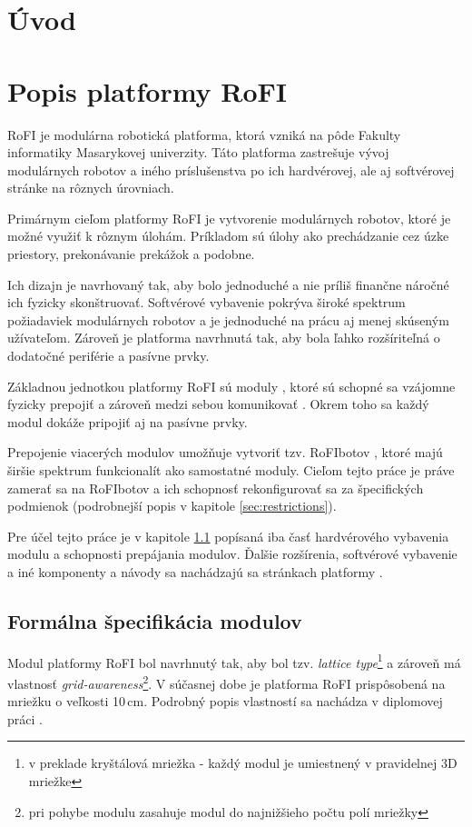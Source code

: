 \documentclass[
  digital, %
  twoside, %
  table,   %
  nolof,     %
  nolot,     %
]{fithesis3}
\begin{document}
\chapter*{Úvod}

\chapter{Popis platformy RoFI}
RoFI je modulárna robotická platforma, ktorá vzniká na pôde Fakulty informatiky Masarykovej univerzity. Táto platforma zastrešuje vývoj modulárnych robotov a iného príslušenstva po ich hardvérovej, ale aj softvérovej stránke na rôznych úrovniach. 

Primárnym cieľom platformy RoFI je vytvorenie modulárnych robotov, ktoré je možné využiť k rôznym úlohám. Príkladom sú úlohy ako prechádzanie cez úzke priestory, prekonávanie prekážok a podobne. 

Ich dizajn je navrhovaný tak, aby bolo jednoduché a nie príliš finančne náročné ich fyzicky skonštruovať. Softvérové vybavenie pokrýva široké spektrum požiadaviek modulárnych robotov a je jednoduché na prácu aj menej skúseným užívateľom. Zároveň je platforma navrhnutá tak, aby bola ľahko rozšíriteľná o dodatočné periférie a pasívne prvky. 

Základnou jednotkou platformy RoFI sú moduly \cite{mrazekMasterThesis}, ktoré sú schopné sa vzájomne fyzicky prepojiť a zároveň medzi sebou komunikovať \cite{rofiCom}. Okrem toho sa každý modul dokáže pripojiť aj na pasívne prvky. 

Prepojenie viacerých modulov umožňuje vytvoriť tzv. RoFIbotov \cite{rofiWeb}, ktoré majú širšie spektrum funkcionalít ako samostatné moduly. Cieľom tejto práce je práve zamerať sa na RoFIbotov a ich schopnosť rekonfigurovať sa za špecifických podmienok (podrobnejší popis v kapitole \ref{sec:restrictions}). 

Pre účel tejto práce je v kapitole \ref{sec:moduleSpec} popísaná iba časť hardvérového vybavenia modulu a schopnosti prepájania modulov. Ďalšie rozšírenia, softvérové vybavenie a iné komponenty a návody sa nachádzajú sa stránkach platformy \cite{rofiWeb}. 

\section{Formálna špecifikácia modulov}
\label{sec:moduleSpec}
Modul platformy RoFI bol navrhnutý tak, aby bol tzv. \textit{lattice type}\footnote{v preklade kryštálová mriežka - každý modul je umiestnený v pravidelnej 3D mriežke} a zároveň má vlastnosť \textit{grid-awareness}\footnote{pri pohybe modulu zasahuje modul do najnižšieho počtu polí mriežky}. V súčasnej dobe je platforma RoFI prispôsobená na mriežku o veľkosti 10\,cm. Podrobný popis vlastností sa nachádza v diplomovej práci \cite{mrazekMasterThesis}. 
\end{document}
